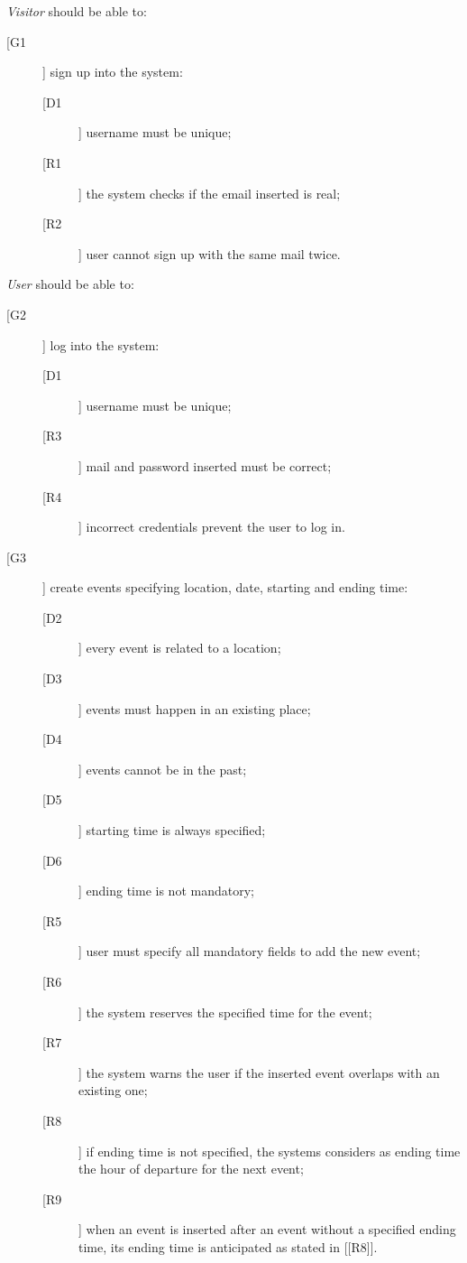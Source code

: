 \textit{Visitor} should be able to:
\begin{description}
\item[[G1]] sign up into the system:
	\begin{description}
	\item[[D1]] username must be unique;
	\newline
	\item[[R1]] the system checks if the email inserted is real;
	\item[[R2]] user cannot sign up with the same mail twice.
	\end{description}
\end{description}

\noindent\textit{User} should be able to:
\begin{description}
\item[[G2]] log into the system:
	\begin{description}
	\item[[D1]] username must be unique;
	\newline
	\item[[R3]] mail and password inserted must be correct;
	\item[[R4]] incorrect credentials prevent the user to log in.
	\end{description}
\item[[G3]] create events specifying location, date, starting and ending time:
	\begin{description}
	\item[[D2]] every event is related to a location;
	\item[[D3]] events must happen in an existing place;
	\item[[D4]] events cannot be in the past;
	\item[[D5]] starting time is always specified;
	\item[[D6]] ending time is not mandatory;
	\newline
	\item[[R5]] user must specify all mandatory fields to add the new event;
	\item[[R6]] the system reserves the specified time for the event;
	\item[[R7]] the system warns the user if the inserted event overlaps with an existing one;
	\item[[R8]] if ending time is not specified, the systems considers as ending time the hour of departure for the next event;
	\item[[R9]] when an event is inserted after an event without a specified ending time, its ending time is anticipated as stated in [[R8]].

\end{description}
\end{description}
